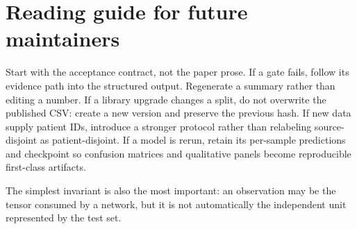 \documentclass[11pt,oneside]{report}
\begin{document}
\chapter{Reading guide for future maintainers}

Start with the acceptance contract, not the paper prose. If a gate fails, follow its evidence path into the structured output. Regenerate a summary rather than editing a number. If a library upgrade changes a split, do not overwrite the published CSV: create a new version and preserve the previous hash. If new data supply patient IDs, introduce a stronger protocol rather than relabeling source-disjoint as patient-disjoint. If a model is rerun, retain its per-sample predictions and checkpoint so confusion matrices and qualitative panels become reproducible first-class artifacts.

The simplest invariant is also the most important: an observation may be the tensor consumed by a network, but it is not automatically the independent unit represented by the test set.



\end{document}
